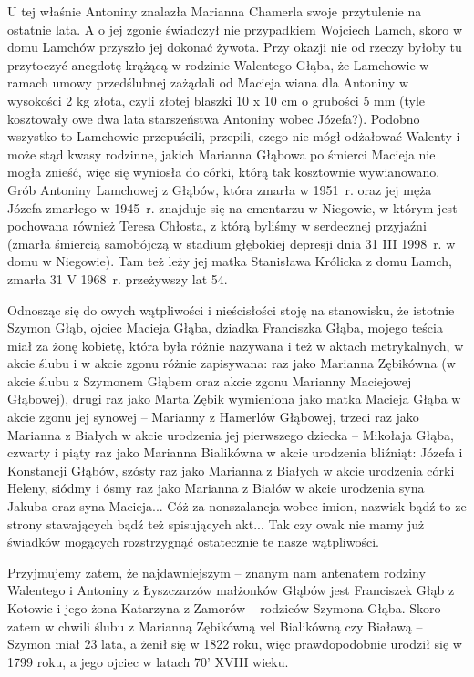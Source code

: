 
U tej właśnie Antoniny znalazła Marianna Chamerla swoje przytulenie na ostatnie lata. A o jej zgonie świadczył nie przypadkiem Wojciech Lamch, skoro w domu Lamchów przyszło jej dokonać żywota. 
Przy okazji nie od rzeczy byłoby tu przytoczyć anegdotę krążącą w rodzinie Walentego Głąba, że Lamchowie w ramach umowy przedślubnej zażądali od Macieja wiana dla Antoniny w wysokości 2 kg złota, czyli złotej blaszki 10 x 10 cm o grubości 5 mm (tyle kosztowały owe dwa lata starszeństwa Antoniny wobec Józefa?).  Podobno wszystko to Lamchowie przepuścili, przepili, czego nie mógł odżałować Walenty i może stąd kwasy rodzinne, jakich Marianna Głąbowa po śmierci Macieja nie mogła znieść, więc się wyniosła do córki, którą tak kosztownie wywianowano. Grób Antoniny Lamchowej z Głąbów, która zmarła w 1951~r. oraz jej męża Józefa zmarłego w 1945~r. znajduje się na cmentarzu w Niegowie, w którym jest pochowana również Teresa Chłosta, z którą byliśmy w serdecznej przyjaźni (zmarła śmiercią samobójczą w stadium głębokiej depresji dnia 31 III 1998~r. w domu w Niegowie). Tam też leży jej matka Stanisława Królicka z domu Lamch, zmarła 31 V 1968~r. przeżywszy lat 54.

Odnosząc się do owych wątpliwości i nieścisłości stoję na stanowisku, że istotnie Szymon Głąb, ojciec Macieja Głąba, dziadka Franciszka Głąba, mojego teścia miał za żonę kobietę, która była różnie nazywana i też w  aktach metrykalnych, w akcie ślubu i w akcie zgonu różnie zapisywana: raz jako Marianna Zębikówna (w akcie ślubu z Szymonem Głąbem oraz akcie zgonu Marianny Maciejowej Głąbowej), drugi raz jako Marta Zębik wymieniona jako matka Macieja Głąba w akcie zgonu jej synowej – Marianny z Hamerlów Głąbowej, trzeci raz jako Marianna z Białych w akcie urodzenia jej pierwszego dziecka – Mikołaja Głąba, czwarty i piąty raz jako Marianna Bialikówna w akcie urodzenia bliźniąt: Józefa i Konstancji Głąbów, szósty raz jako Marianna z Białych w akcie urodzenia córki Heleny, siódmy i ósmy raz jako Marianna z Białów w akcie urodzenia syna Jakuba oraz syna Macieja... Cóż za nonszalancja wobec imion, nazwisk bądź to ze strony stawających bądź też spisujących akt... Tak czy owak nie mamy już świadków mogących rozstrzygnąć ostatecznie te nasze wątpliwości.

Przyjmujemy zatem, że najdawniejszym -- znanym nam antenatem rodziny Walentego i Antoniny z Łyszczarzów małżonków Głąbów jest Franciszek Głąb z Kotowic i jego żona Katarzyna z Zamorów -- rodziców Szymona Głąba. Skoro zatem w chwili ślubu z Marianną Zębikówną vel Bialikówną czy Białawą -- Szymon miał 23 lata, a żenił się w 1822 roku, więc prawdopodobnie urodził się w 1799 roku, a jego ojciec w latach 70’ XVIII wieku.

